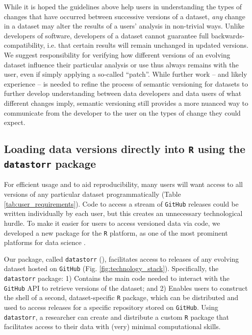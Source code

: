 \documentclass[a4paper,num-refs]{oup-contemporary}
\begin{document}
While it is hoped the guidelines above help users in understanding the types of changes that have occurred between successive versions of a dataset, \emph{any} change in a dataset may alter the results of a users' analysis in non-trivial ways. Unlike developers of software, developers of a dataset cannot guarantee full backwards-compatibility, i.e. that certain results will remain unchanged in updated versions. We suggest responsibility for verifying how different versions of an evolving dataset influence their particular analysis or use thus always remains with the user, even if simply applying a so-called ``patch''. While further work -- and likely experience -- is needed to refine the process of semantic versioning for datasets to further develop understanding between data developers and data users of what different changes imply, semantic versioning still provides a more nuanced way to communicate from the developer to the user on the types of change they could expect.

\subsection{Loading data versions directly into \texttt{R} using the \texttt{datastorr} package}

For efficient usage and to aid reproducibility, many users will want access to all versions of any particular dataset programmatically (Table \ref{tab:user_requirements}). Code to access a stream of \texttt{GitHub} releases could be written individually by each user, but this creates an unnecessary technological hurdle. To make it easier for users to access versioned data via code, we developed a new package for the \texttt{R} platform, as one of the most prominent platforms for data science \cite{R-2017}.

Our package, called \texttt{datastorr} (), facilitates access to releases of any evolving dataset hosted on \texttt{GitHub} (Fig. \ref{fig:technology_stack}). Specifically, the \texttt{datastorr} package: 1) Contains the main code needed to interact with the \texttt{GitHub} API to retrieve versions of the dataset; and 2) Enables users to construct the shell of a second, dataset-specific \texttt{R} package, which can be distributed and used to access releases for a specific repository stored on \texttt{GitHub}. Using \texttt{datastorr}, a researcher can create and distribute a custom \texttt{R} package that facilitates access to their data with (very) minimal computational skills.
\end{document}
